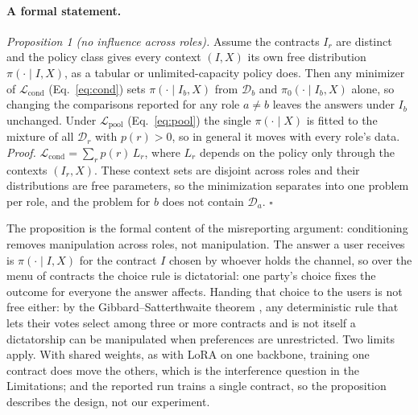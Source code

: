 \documentclass[letterpaper]{article} %
\begin{document}
\paragraph{A formal statement.}
\emph{Proposition 1 (no influence across roles).} Assume the contracts $I_r$ are distinct and the policy class gives every context $(I,X)$ its own free distribution $\pi(\cdot\mid I,X)$, as a tabular or unlimited-capacity policy does. Then any minimizer of $\mathcal{L}_{\mathrm{cond}}$ (Eq.~\ref{eq:cond}) sets $\pi(\cdot\mid I_b,X)$ from $\mathcal{D}_b$ and $\pi_0(\cdot\mid I_b,X)$ alone, so changing the comparisons reported for any role $a\neq b$ leaves the answers under $I_b$ unchanged. Under $\mathcal{L}_{\mathrm{pool}}$ (Eq.~\ref{eq:pool}) the single $\pi(\cdot\mid X)$ is fitted to the mixture of all $\mathcal{D}_r$ with $p(r)>0$, so in general it moves with every role's data.
\emph{Proof.} $\mathcal{L}_{\mathrm{cond}}=\sum_r p(r)\,L_r$, where $L_r$ depends on the policy only through the contexts $(I_r,X)$. These context sets are disjoint across roles and their distributions are free parameters, so the minimization separates into one problem per role, and the problem for $b$ does not contain $\mathcal{D}_a$. $\square$

The proposition is the formal content of the misreporting argument: conditioning removes manipulation across roles, not manipulation. The answer a user receives is $\pi(\cdot\mid I,X)$ for the contract $I$ chosen by whoever holds the channel, so over the menu of contracts the choice rule is dictatorial: one party's choice fixes the outcome for everyone the answer affects. Handing that choice to the users is not free either: by the Gibbard--Satterthwaite theorem \cite{gibbard1973manipulation,satterthwaite1975strategy}, any deterministic rule that lets their votes select among three or more contracts and is not itself a dictatorship can be manipulated when preferences are unrestricted. Two limits apply. With shared weights, as with LoRA on one backbone, training one contract does move the others, which is the interference question in the Limitations; and the reported run trains a single contract, so the proposition describes the design, not our experiment.
\end{document}

